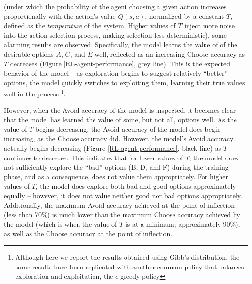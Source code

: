 \documentclass[10pt,letterpaper]{article}
\begin{document}
(under which the probability of the agent choosing a given action increases proportionally with the action's value $Q(s,a)$, normalized by a constant $T$, defined as the \emph{temperature} of the system. Higher values of $T$ inject more noise into the action selection process, making selection less deterministic), some alarming results are observed. Specifically, the model learns the value of of the desirable options $A$, $C$, and $E$ well, reflected as an increasing Choose accuracy as $T$ decreases (Figure \ref{RL-agent-performance}, grey line). This is the expected behavior of the model -- as exploration begins to suggest relatively ``better'' options, the model quickly switches to exploiting them, learning their true values well in the process \footnote{Although here we report the results obtained using Gibb's distribution, the same results have been replicated with another common policy that balances exploration and exploitation, the $\epsilon$-greedy policy}. 

However, when the Avoid accuracy of the model is inspected, it becomes clear that the model has learned the value of some, but not all, options well. As the value of $T$ begins decreasing, the Avoid accuracy of the model does begin increasing, as the Choose accuracy did. However, the model's Avoid accuracy actually begins decreasing (Figure \ref{RL-agent-performance}, black line) as $T$ continues to decrease. This indicates that for lower values of $T$, the model does not sufficiently explore the ``bad'' options (B, D, and F) during the training phase, and as a consequence, does not value them appropriately. For higher values of $T$, the model does explore both bad and good options approximately equally -- however, it does not value neither good nor bad options appropriately. Additionally, the maximum Avoid accuracy achieved at the point of inflection (less than 70\%) is much lower than the maximum Choose accuracy achieved by the model (which is when the value of $T$ is at a minimum; approximately 90\%), as well as the Choose accuracy at the point of inflection. 
\end{document}
